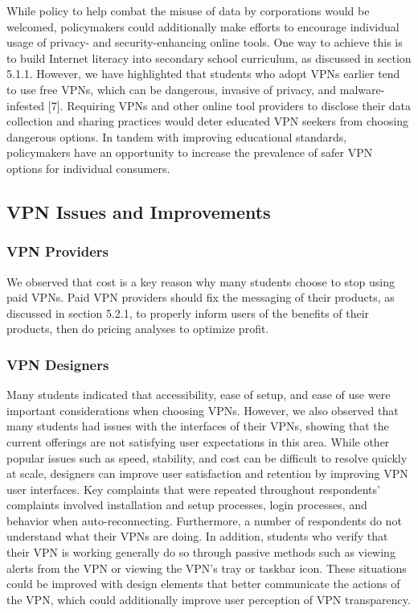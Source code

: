 While policy to help combat the misuse of data by corporations would be welcomed, policymakers could additionally make efforts to encourage individual usage of privacy- and security-enhancing online tools. One way to achieve this is to build Internet literacy into secondary school curriculum, as discussed in section 5.1.1. However, we have highlighted that students who adopt VPNs earlier tend to use free VPNs, which can be dangerous, invasive of privacy, and malware-infested [7]. Requiring VPNs and other online tool providers to disclose their data collection and sharing practices would deter educated VPN seekers from choosing dangerous options. In tandem with improving educational standards, policymakers have an opportunity to increase the prevalence of safer VPN options for individual consumers.

\subsection{VPN Issues and Improvements}
\subsubsection{VPN Providers}

We observed that cost is a key reason why many students choose to stop using paid VPNs. Paid VPN providers should fix the messaging of their products, as discussed in section 5.2.1, to properly inform users of the benefits of their products, then do pricing analyses to optimize profit.

\subsubsection{VPN Designers}

Many students indicated that accessibility, ease of setup, and ease of use were important considerations when choosing VPNs. However, we also observed that many students had issues with the interfaces of their VPNs, showing that the current offerings are not satisfying user expectations in this area. While other popular issues such as speed, stability, and cost can be difficult to resolve quickly at scale, designers can improve user satisfaction and retention by improving VPN user interfaces. Key complaints that were repeated throughout respondents’ complaints involved installation and setup processes, login processes, and behavior when auto-reconnecting. Furthermore, a number of respondents do not understand what their VPNs are doing. In addition, students who verify that their VPN is working generally do so through passive methods such as viewing alerts from the VPN or viewing the VPN’s tray or taskbar icon. These situations could be improved with design elements that better communicate the actions of the VPN, which could additionally improve user perception of VPN transparency.

